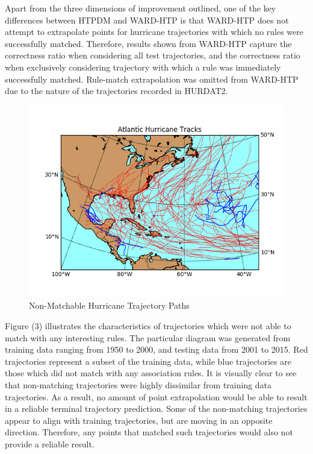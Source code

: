\documentclass[12pt,conference]{IEEEtran}
\begin{document}
Apart from the three dimensions of improvement outlined, one of the key differences between HTPDM and WARD-HTP is that WARD-HTP does not attempt to extrapolate points for hurricane trajectories with which no rules were successfully matched. Therefore, results shown from WARD-HTP capture the correctness ratio when considering all test trajectories, and the correctness ratio when exclusively considering trajectory with which a rule was immediately successfully matched. Rule-match extrapolation was omitted from WARD-HTP due to the nature of the trajectories recorded in HURDAT2.

\begin{figure}[htp]
\caption{Non-Matchable Hurricane Trajectory Paths}
\centering
\includegraphics[scale=0.6]{Rule-Miss-Diagram}
\end{figure}

Figure (3) illustrates the characteristics of trajectories which were not able to match with any interesting rules. The particular diagram was generated from training data ranging from 1950 to 2000, and testing data from 2001 to 2015. Red trajectories represent a subset of the training data, while blue trajectories are those which did not match with any association rules. It is visually clear to see that non-matching trajectories were highly dissimilar from training data trajectories. As a result, no amount of point extrapolation would be able to result in a reliable terminal trajectory prediction. Some of the non-matching trajectories appear to align with training trajectories, but are moving in an opposite direction. Therefore, any points that matched such trajectories would also not provide a reliable result.
\end{document}
